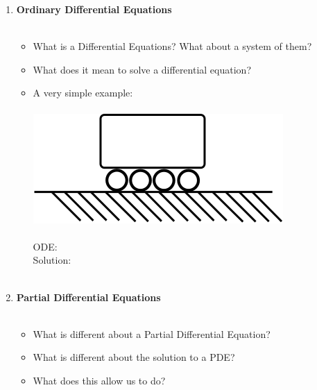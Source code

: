 \documentclass[11pt]{article}
\begin{document}
\begin{enumerate}
			\item \textbf{  Ordinary Differential Equations}\\\\ 
			\begin{itemize}
					\item What is a Differential Equations? What about a system of them?\vspace{20mm} \\
					\item What does it mean to solve a differential equation? \vspace{20mm} \\
					\item A very simple example:\\\\
					\includegraphics[scale=.6]{lecture1_fig3.png}\\\\
					\Large {ODE:}\vspace{30mm}\\
					\Large {Solution:}\\\\
			\end{itemize}
\newpage			
			\item \textbf{  Partial Differential Equations}\\\\ 
			\begin{itemize}
					\item What is different about a Partial Differential Equation? \vspace{20mm} \\
					
					\item What is different about the solution to a PDE?  \vspace{20mm}  \\
					
					\item What does this allow us to do? \\
					
			\end{itemize}
	\end{enumerate}
		



	
\end{document}
